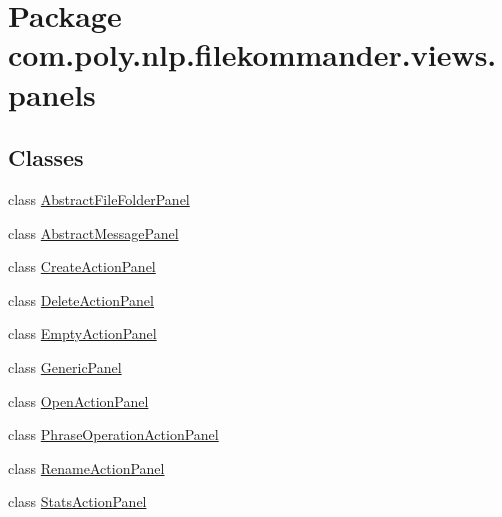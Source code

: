 \hypertarget{namespacecom_1_1poly_1_1nlp_1_1filekommander_1_1views_1_1panels}{\section{Package com.\-poly.\-nlp.\-filekommander.\-views.\-panels}
\label{namespacecom_1_1poly_1_1nlp_1_1filekommander_1_1views_1_1panels}
}
\subsection*{Classes}
\begin{DoxyCompactItemize}
\item 
class \hyperlink{classcom_1_1poly_1_1nlp_1_1filekommander_1_1views_1_1panels_1_1_abstract_file_folder_panel}{Abstract\-File\-Folder\-Panel}
\item 
class \hyperlink{classcom_1_1poly_1_1nlp_1_1filekommander_1_1views_1_1panels_1_1_abstract_message_panel}{Abstract\-Message\-Panel}
\item 
class \hyperlink{classcom_1_1poly_1_1nlp_1_1filekommander_1_1views_1_1panels_1_1_create_action_panel}{Create\-Action\-Panel}
\item 
class \hyperlink{classcom_1_1poly_1_1nlp_1_1filekommander_1_1views_1_1panels_1_1_delete_action_panel}{Delete\-Action\-Panel}
\item 
class \hyperlink{classcom_1_1poly_1_1nlp_1_1filekommander_1_1views_1_1panels_1_1_empty_action_panel}{Empty\-Action\-Panel}
\item 
class \hyperlink{classcom_1_1poly_1_1nlp_1_1filekommander_1_1views_1_1panels_1_1_generic_panel}{Generic\-Panel}
\item 
class \hyperlink{classcom_1_1poly_1_1nlp_1_1filekommander_1_1views_1_1panels_1_1_open_action_panel}{Open\-Action\-Panel}
\item 
class \hyperlink{classcom_1_1poly_1_1nlp_1_1filekommander_1_1views_1_1panels_1_1_phrase_operation_action_panel}{Phrase\-Operation\-Action\-Panel}
\item 
class \hyperlink{classcom_1_1poly_1_1nlp_1_1filekommander_1_1views_1_1panels_1_1_rename_action_panel}{Rename\-Action\-Panel}
\item 
class \hyperlink{classcom_1_1poly_1_1nlp_1_1filekommander_1_1views_1_1panels_1_1_stats_action_panel}{Stats\-Action\-Panel}
\end{DoxyCompactItemize}
